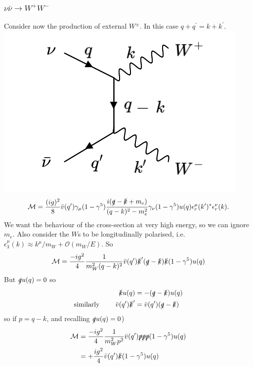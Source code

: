 \documentclass[a4paper,12pt]{article}
\begin{document}
\subsubsection{$\nu \bar{\nu} \to W^+ W^-$}
%
Consider now the production of external $W^\pm$. In this case $q + q^\prime = k + k^\prime$. 
\newline
%
  \includegraphics[width=0.4\linewidth]{figs/18a.png}
%
\begin{equation}
\mathcal{M} = \frac{(ig)^2}{8} \bar{v}(q^\prime) \gamma_\mu(1-\gamma^5)\frac{i(\slashed{q}-\slashed{k}+m_e)}{(q-k)^2 -m_e^2}\gamma_\nu(1-\gamma^5)u(q)\epsilon_r^\mu(k^\prime)^* \epsilon_r^\nu(k).
\end{equation}
We want the behaviour of the cross-section at very high energy, so we can ignore $m_e$. Also consider the $W$s to be longitudinally polarised, i.e. $\epsilon_3^\mu(k) \approx k^\mu/m_W + \mathcal{O}(m_W/E)$. So
\begin{equation}
\mathcal{M} = \frac{-ig^2}{4}\frac{1}{m_W^2(q-k)^2}\bar{v}(q^\prime)\slashed{k}^\prime(\slashed{q}-\slashed{k})\slashed{k}(1-\gamma^5)u(q)
\end{equation}
But $\slashed{q}u(q)=0$ so 
\begin{equation}
\begin{split}
\slashed{k}u(q) &= - (\slashed{q}-\slashed{k})u(q) \\
\text{similarly } \qquad \bar{v}(q^\prime)\slashed{k}^\prime &= \bar{v}(q^\prime)(\slashed{q}-\slashed{k})
\end{split}
\end{equation}
so if $p = q -k$, and recalling $\slashed{q}u(q)=0$)
\begin{equation}
\begin{split}
\mathcal{M} &= \frac{-ig^2}{4}\frac{1}{m_W^2p^2}\bar{v}(q^\prime)\slashed{p}\slashed{p}\slashed{p}(1-\gamma^5)u(q) \\
&= +\frac{ig^2}{4}\bar{v}(q^\prime)\slashed{k}(1-\gamma^5)u(q)
\end{split}
\end{equation}
\end{document}
